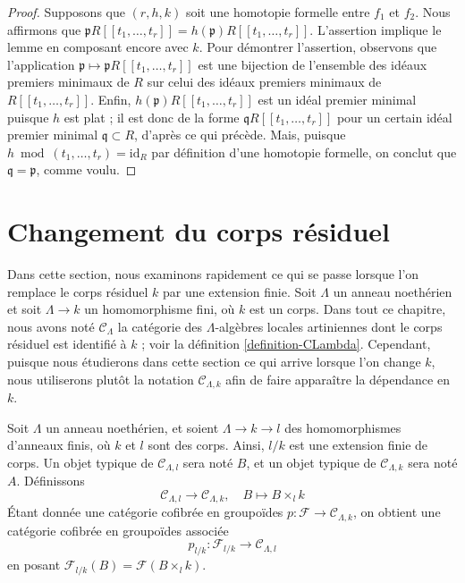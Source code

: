 \begin{proof}
Supposons que $(r, h, k)$ soit une homotopie formelle entre $f_1$ et $f_2$.
Nous affirmons que
$\mathfrak pR[[t_1, \ldots, t_r]] = h(\mathfrak p)R[[t_1, \ldots, t_r]]$.
L'assertion implique le lemme en composant encore avec $k$. Pour démontrer
l'assertion, observons que l'application
$\mathfrak p \mapsto \mathfrak pR[[t_1, \ldots, t_r]]$
est une bijection de l'ensemble des idéaux premiers minimaux de $R$ sur celui
des idéaux premiers minimaux de $R[[t_1, \ldots, t_r]]$. Enfin,
$h(\mathfrak p)R[[t_1, \ldots, t_r]]$ est un idéal premier minimal puisque $h$ est
plat ; il est donc de la forme $\mathfrak q R[[t_1, \ldots, t_r]]$ pour un
certain idéal premier minimal $\mathfrak q \subset R$, d'après ce qui précède.
Mais, puisque $h \bmod (t_1, \ldots, t_r) = \text{id}_R$ par définition d'une
homotopie formelle, on conclut que $\mathfrak q = \mathfrak p$, comme voulu.
\end{proof}











\section{Changement du corps résiduel}
\label{section-change-of-field}

\noindent
Dans cette section, nous examinons rapidement ce qui se passe lorsque l'on
remplace le corps résiduel $k$ par une extension finie. Soit $\Lambda$ un
anneau noethérien et soit $\Lambda \to k$ un homomorphisme fini, où $k$ est un
corps. Dans tout ce chapitre, nous avons noté $\mathcal{C}_\Lambda$ la
catégorie des $\Lambda$-algèbres locales artiniennes dont le corps résiduel est
identifié à $k$ ; voir la définition \ref{definition-CLambda}. Cependant,
puisque nous étudierons dans cette section ce qui arrive lorsque l'on change
$k$, nous utiliserons plutôt la notation $\mathcal{C}_{\Lambda, k}$ afin de
faire apparaître la dépendance en $k$.

\begin{situation}
\label{situation-change-of-fields}
Soit $\Lambda$ un anneau noethérien, et soient $\Lambda \to k \to l$ des
homomorphismes d'anneaux finis, où $k$ et $l$ sont des corps. Ainsi, $l/k$ est
une extension finie de corps. Un objet typique de
$\mathcal{C}_{\Lambda, l}$ sera noté $B$, et un objet typique de
$\mathcal{C}_{\Lambda, k}$ sera noté $A$. Définissons
\begin{equation}
\label{equation-comparison}
\mathcal{C}_{\Lambda, l} \longrightarrow \mathcal{C}_{\Lambda, k},
\quad
B \longmapsto B \times_l k
\end{equation}
Étant donnée une catégorie cofibrée en groupoïdes
$p : \mathcal{F} \to \mathcal{C}_{\Lambda, k}$, on obtient une catégorie
cofibrée en groupoïdes associée
$$
p_{l/k} : \mathcal{F}_{l/k} \longrightarrow \mathcal{C}_{\Lambda, l}
$$
en posant $\mathcal{F}_{l/k}(B) = \mathcal{F}(B \times_l k)$.
\end{situation}

